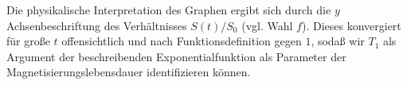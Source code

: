 \documentclass[../Zusammenfassung/main.tex]{subfiles}
\begin{document}
    Die physikalische Interpretation des Graphen ergibt sich durch die $y$ Achsenbeschriftung des Verhältnisses $S(t)/S_0$ (vgl. Wahl $f$). Dieses konvergiert für große $t$ offensichtlich und nach Funktionsdefinition gegen $1$, sodaß wir $T_1$ als Argument der beschreibenden Exponentialfunktion als Parameter der Magnetisierungslebensdauer identifizieren können. 
\end{document}
